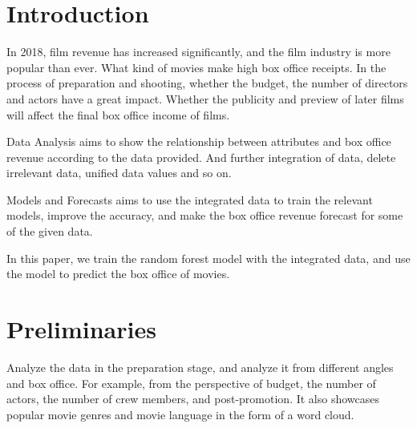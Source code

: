 \section{Introduction}
\label{sec-intro}
In 2018, film revenue has increased significantly, and the film industry is more popular than ever.
What kind of movies make high box office receipts. In the process of preparation and shooting, 
whether the budget, the number of directors and actors have a great impact. Whether the publicity and 
preview of later films will affect the final box office income of films.

Data Analysis aims to show the relationship between attributes and box office revenue 
according to the data provided. And further integration of data, delete irrelevant data, 
unified data values and so on.

Models and Forecasts aims to use the integrated data to train the relevant models, 
improve the accuracy, and make the box office revenue forecast for some of the given data.

In this paper, we train the random forest model with the integrated data, 
and use the model to predict the box office of movies.
\section{Preliminaries} \label{sec-preliminaries}
Analyze the data in the preparation stage, and analyze it from different angles and box office. 
For example, from the perspective of budget, the number of actors, the number of crew members, 
and post-promotion. It also showcases popular movie genres and movie language in the form of a word cloud.




